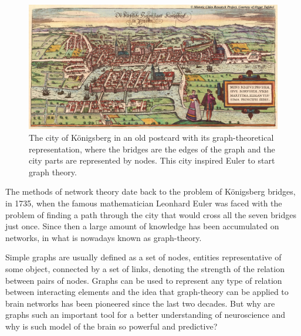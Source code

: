 \noindent\begin{figure}[htb]
\centering
\begin{minipage}[b]{0.5\textwidth}
\includegraphics[width=1\linewidth]{images/konigsberg.jpg}
\end{minipage}\begin{minipage}[b]{0.5\textwidth}
\centering
{}
\end{minipage}
\caption*{\textsf{The city of K{\"o}nigsberg in an old postcard with its graph-theoretical representation, where the bridges are the edges of the graph and the city parts are represented by nodes. This city inspired Euler to start graph theory.}}
\end{figure}

The methods of network theory date back to the problem of K{\"o}nigsberg bridges, in 1735, when the famous mathematician Leonhard Euler was faced with the problem of finding a path through the city that would cross all the seven bridges just once.
Since then a large amount of knowledge has been accumulated on networks, in what is nowadays known as graph-theory.

Simple graphs are usually defined as a set of nodes, entities representative of some object, connected by a set of links, denoting the strength of the relation between pairs of nodes.
Graphs can be used to represent any type of relation between interacting elements and the idea that graph-theory can be applied to brain networks has been pioneered since the last two decades.
But why are graphs such an important tool for a better understanding of neuroscience and why is such model of the brain so powerful and predictive?


